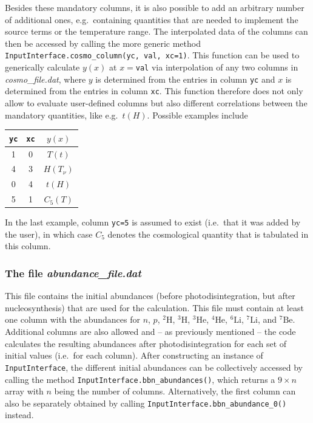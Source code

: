 \documentclass[11pt,a4paper]{article}
\begin{document}
\noindent Besides these mandatory columns, it is also possible to add an arbitrary number of additional ones, e.g.\ containing quantities that are needed to implement the source terms or the temperature range. The interpolated data of the columns can then be accessed by calling the more generic method \texttt{InputInterface.cosmo\_column(yc, val, xc=1)}. This function can be used to generically calculate $y(x)$ at $x=$\texttt{val} via interpolation of any two columns in \textit{cosmo\_file.dat}, where $y$ is determined from the entries in column \texttt{yc} and $x$ is determined from the entries in column \texttt{xc}. This function therefore does not only allow to evaluate user-defined columns but also different correlations between the mandatory quantities, like e.g.\ $t(H)$. Possible examples include

\begin{center}
\begin{tabular}{|c|c|c|}
	\hline
	\texttt{yc} & \texttt{xc} & $y(x)$ \\
	\hline
	1 & 0 & $T(t)$ \\
	\hline
	4 & 3 & $H(T_\nu)$ \\
	\hline
	0 & 4 & $t(H)$ \\
	\hline
	5 & 1 & $C_5(T)$ \\
	\hline
\end{tabular}
\end{center}

\noindent In the last example, column \texttt{yc=5} is assumed to exist (i.e.\ that it was added by the user), in which case $C_5$ denotes the cosmological quantity that is tabulated in this column.

\subsubsection{The file \textit{abundance\_file.dat}}
This file contains the initial abundances (before photodisintegration, but after nucleosynthesis) that are used for the calculation. This file must contain at least one column with the abundances for $n$, $p$, ${}^2\text{H}$, ${}^3\text{H}$, ${}^3\text{He}$, ${}^4\text{He}$, ${}^6\text{Li}$, ${}^7\text{Li}$, and ${}^7\text{Be}$. Additional columns are also allowed and -- as previously mentioned -- the code calculates the resulting abundances after photodisintegration for each set of initial values (i.e.\ for each column). After constructing an instance of \texttt{InputInterface}, the different initial abundances can be collectively accessed by calling the method \texttt{InputInterface.bbn\_abundances()}, which returns a $9\times n$ array with $n$ being the number of columns. Alternatively, the first column can also be separately obtained by calling \texttt{InputInterface.bbn\_abundance\_0()} instead.
\end{document}
